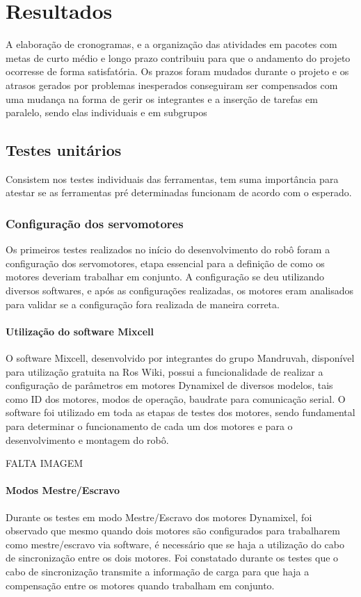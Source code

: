 \chapter{Resultados}
\label{chap:result}
A elaboração de cronogramas, e a organização das atividades em pacotes com metas de curto médio e longo prazo contribuiu para que o andamento do projeto ocorresse de forma satisfatória. Os prazos foram mudados  durante o projeto e os atrasos gerados por problemas inesperados conseguiram ser compensados com uma mudança na forma de gerir os integrantes e a inserção de tarefas em paralelo, sendo elas individuais e em subgrupos


\section{Testes unitários}
\label{sec:testu}
Consistem nos testes individuais das ferramentas, tem suma importância para atestar se as ferramentas pré determinadas funcionam de acordo com o esperado.


\subsection{Configuração dos servomotores}
Os primeiros testes realizados no início do desenvolvimento do robô foram a configuração dos servomotores, etapa essencial para a definição de como os motores deveriam trabalhar em conjunto. A configuração se deu utilizando diversos softwares, e após as configurações realizadas, os motores eram analisados para validar se a configuração fora realizada de maneira correta.

\subsubsection{Utilização do software Mixcell}
O software Mixcell, desenvolvido por integrantes do grupo Mandruvah, disponível para utilização gratuita na Ros Wiki, possui a funcionalidade de realizar a configuração de parâmetros em motores Dynamixel de diversos modelos, tais como ID dos motores, modos de operação, baudrate para comunicação serial. O software foi utilizado em toda as etapas de testes dos motores, sendo fundamental para determinar o funcionamento de cada um dos motores e para o desenvolvimento e montagem do robô. 

FALTA IMAGEM
\subsubsection{Modos Mestre/Escravo}
Durante os testes em modo Mestre/Escravo dos motores Dynamixel, foi observado que mesmo quando dois motores são configurados para trabalharem como mestre/escravo via software, é necessário que se haja a utilização do cabo de sincronização entre os dois motores. Foi constatado durante os testes que o cabo de sincronização transmite a informação de carga para que haja a compensação entre os motores quando trabalham em conjunto. 

